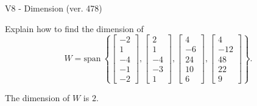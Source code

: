 \begin{exercise}
  \begin{exerciseTitle}V8 - Dimension (ver. 478)\end{exerciseTitle}
  \begin{exerciseStatement}
    Explain how to find the dimension of 
\[W=\mathrm{span}\ \left\{\left[\begin{array}{r}
-2 \\
1 \\
-4 \\
-1 \\
-2
\end{array}\right] , \left[\begin{array}{r}
2 \\
1 \\
-4 \\
-3 \\
1
\end{array}\right] , \left[\begin{array}{r}
4 \\
-6 \\
24 \\
10 \\
6
\end{array}\right] , \left[\begin{array}{r}
4 \\
-12 \\
48 \\
22 \\
9
\end{array}\right]\right\}.\]



  \end{exerciseStatement}
  \begin{exerciseAnswer}
   The dimension of \(W\) is  \(2\).
  


  \end{exerciseAnswer}
\end{exercise}